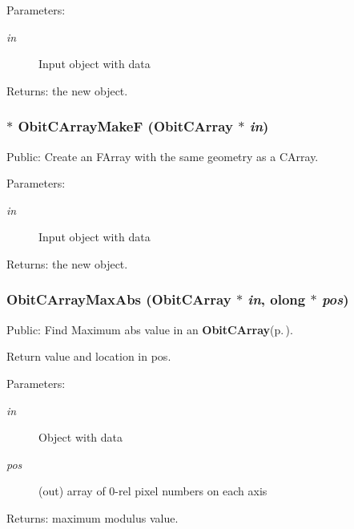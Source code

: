 \begin{Desc}
\item[Parameters:]
\begin{description}
\item[{\em in}]Input object with data \end{description}
\end{Desc}
\begin{Desc}
\item[Returns:]the new object. \end{Desc}
\subsubsection{$\ast$ Obit\-CArray\-Make\-F ({\bf Obit\-CArray} $\ast$ {\em in})}\label{ObitCArray_8c_a26}


Public: Create an FArray with the same geometry as a CArray. 

\begin{Desc}
\item[Parameters:]
\begin{description}
\item[{\em in}]Input object with data \end{description}
\end{Desc}
\begin{Desc}
\item[Returns:]the new object. \end{Desc}
\subsubsection{ Obit\-CArray\-Max\-Abs ({\bf Obit\-CArray} $\ast$ {\em in}, {\bf olong} $\ast$ {\em pos})}\label{ObitCArray_8c_a13}


Public: Find Maximum abs value in an {\bf Obit\-CArray}{\rm (p.\,\pageref{structObitCArray})}. 

Return value and location in pos. \begin{Desc}
\item[Parameters:]
\begin{description}
\item[{\em in}]Object with data \item[{\em pos}](out) array of 0-rel pixel numbers on each axis \end{description}
\end{Desc}
\begin{Desc}
\item[Returns:]maximum modulus value. \end{Desc}
